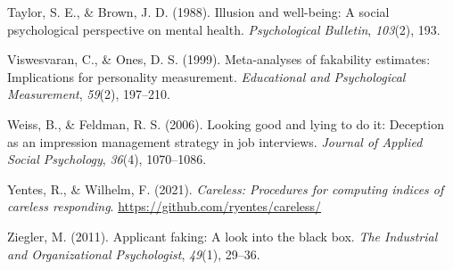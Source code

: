 \documentclass[
  ,jou]{apa6}
\newlength{\cslhangindent}
\newlength{\cslentryspacingunit} %
\newenvironment{CSLReferences}[2] %
 {%
  \setlength{\parindent}{0pt}
  \ifodd #1
  \let\oldpar\par
  \def\par{\hangindent=\cslhangindent\oldpar}
  \fi
  \setlength{\parskip}{#2\cslentryspacingunit}
 }%
 {}
\begin{document}
\begin{CSLReferences}{1}{0}
\leavevmode{}%
Taylor, S. E., \& Brown, J. D. (1988). Illusion and well-being: A social psychological perspective on mental health. \emph{Psychological Bulletin}, \emph{103}(2), 193.

\leavevmode{}%
Viswesvaran, C., \& Ones, D. S. (1999). Meta-analyses of fakability estimates: Implications for personality measurement. \emph{Educational and Psychological Measurement}, \emph{59}(2), 197--210.

\leavevmode{}%
Weiss, B., \& Feldman, R. S. (2006). Looking good and lying to do it: Deception as an impression management strategy in job interviews. \emph{Journal of Applied Social Psychology}, \emph{36}(4), 1070--1086.

\leavevmode{}%
Yentes, R., \& Wilhelm, F. (2021). \emph{Careless: Procedures for computing indices of careless responding}. \url{https://github.com/ryentes/careless/}

\leavevmode{}%
Ziegler, M. (2011). Applicant faking: A look into the black box. \emph{The Industrial and Organizational Psychologist}, \emph{49}(1), 29--36.

\end{CSLReferences}

\endgroup
\end{document}

